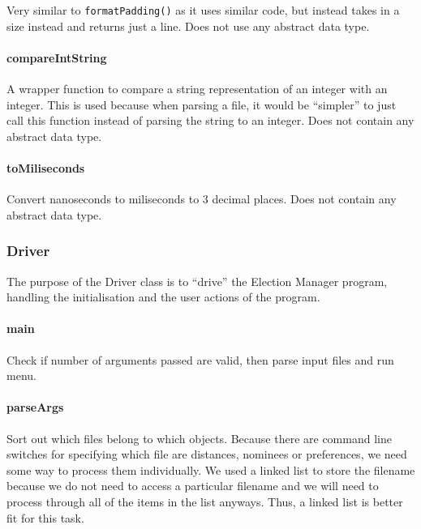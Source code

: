 \documentclass[a4paper, 12pt, titlepage]{article}
\newcommand{\code}[1]{\small\texttt{#1}\normalsize}
\begin{document}
Very similar to \code{formatPadding()} as it uses similar code, but instead
takes in a size instead and returns just a line. Does not use any abstract
data type.

\paragraph{compareIntString} \hspace{0pt}

A wrapper function to compare a string representation of an integer with
an integer. This is used because when parsing a file, it would be ``simpler''
to just call this function instead of parsing the string to an integer.
Does not contain any abstract data type.

\paragraph{toMiliseconds} \hspace{0pt}

Convert nanoseconds to miliseconds to 3 decimal places. Does not contain
any abstract data type.

\newpage

\subsubsection{Driver}

The purpose of the Driver class is to ``drive'' the Election Manager program,
handling the initialisation and the user actions of the program.

\paragraph{main} \hspace{0pt}

Check if number of arguments passed are valid, then parse input files and
run menu.

\paragraph{parseArgs} \hspace{0pt}

Sort out which files belong to which objects. Because there are command line
switches for specifying which file are distances, nominees or preferences,
we need some way to process them individually. We used a linked list to
store the filename because we do not need to access a particular filename
and we will need to process through all of the items in the list anyways.
Thus, a linked list is better fit for this task.
\end{document}
